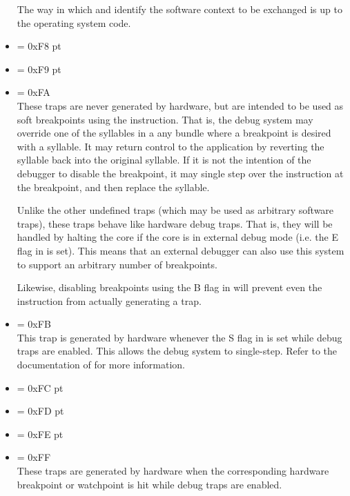 \begin{itemize}
The way in which  and  identify the software context to be
exchanged is up to the operating system code.

\setcounter{enumi}{247}
\item {} \label{trap:SOFT_DEBUG_0}  = 0xF8
 pt\relax
\item {} \label{trap:SOFT_DEBUG_1}  = 0xF9
 pt\relax
\item {} \label{trap:SOFT_DEBUG_2}  = 0xFA
\\[6 pt]
These traps are never generated by hardware, but are intended to be used as soft
breakpoints using the  instruction. That is, the debug system may
override one of the syllables in a any bundle where a breakpoint is desired with
a  syllable. It may return control to the application by reverting
the  syllable back into the original syllable. If it is not the
intention of the debugger to disable the breakpoint, it may single step over
the instruction at the breakpoint, and then replace the  syllable.

Unlike the other undefined traps (which may be used as arbitrary software
traps), these traps behave like hardware debug traps. That is, they will be
handled by halting the core if the core is in external debug mode (i.e. the E
flag in  is set). This means that an external debugger can also use
this system to support an arbitrary number of breakpoints.

Likewise, disabling breakpoints using the B flag in  will prevent even
the  instruction from actually generating a trap.

\setcounter{enumi}{250}
\item {} \label{trap:STEP_COMPLETE}  = 0xFB
\\[6 pt]
This trap is generated by hardware whenever the S flag in  is set
while debug traps are enabled. This allows the debug system to single-step.
Refer to the documentation of  for more information.

\setcounter{enumi}{251}
\item {} \label{trap:HW_BREAKPOINT_0}  = 0xFC
 pt\relax
\item {} \label{trap:HW_BREAKPOINT_1}  = 0xFD
 pt\relax
\item {} \label{trap:HW_BREAKPOINT_2}  = 0xFE
 pt\relax
\item {} \label{trap:HW_BREAKPOINT_3}  = 0xFF
\\[6 pt]
These traps are generated by hardware when the corresponding hardware breakpoint
or watchpoint is hit while debug traps are enabled.

\end{itemize}
